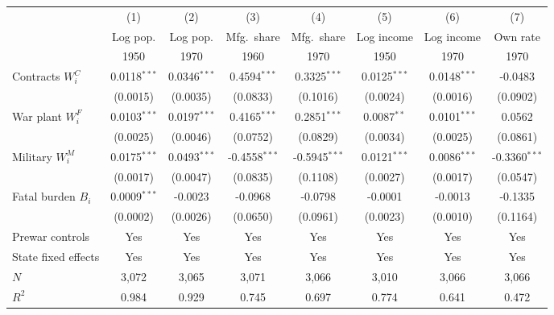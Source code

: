 \begin{tabular}{lccccccc}
\toprule
& (1) & (2) & (3) & (4) & (5) & (6) & (7) \\
& Log pop. & Log pop. & Mfg.\ share & Mfg.\ share & Log income & Log income & Own rate \\
& 1950 & 1970 & 1960 & 1970 & 1950 & 1970 & 1970 \\
\midrule
Contracts $W^C_i$ & 0.0118$^{***}$ & 0.0346$^{***}$ & 0.4594$^{***}$ & 0.3325$^{***}$ & 0.0125$^{***}$ & 0.0148$^{***}$ & -0.0483 \\
 & (0.0015) & (0.0035) & (0.0833) & (0.1016) & (0.0024) & (0.0016) & (0.0902) \\
War plant $W^F_i$ & 0.0103$^{***}$ & 0.0197$^{***}$ & 0.4165$^{***}$ & 0.2851$^{***}$ & 0.0087$^{**}$ & 0.0101$^{***}$ & 0.0562 \\
 & (0.0025) & (0.0046) & (0.0752) & (0.0829) & (0.0034) & (0.0025) & (0.0861) \\
Military $W^M_i$ & 0.0175$^{***}$ & 0.0493$^{***}$ & -0.4558$^{***}$ & -0.5945$^{***}$ & 0.0121$^{***}$ & 0.0086$^{***}$ & -0.3360$^{***}$ \\
 & (0.0017) & (0.0047) & (0.0835) & (0.1108) & (0.0027) & (0.0017) & (0.0547) \\
Fatal burden $B_i$ & 0.0009$^{***}$ & -0.0023 & -0.0968 & -0.0798 & -0.0001 & -0.0013 & -0.1335 \\
 & (0.0002) & (0.0026) & (0.0650) & (0.0961) & (0.0023) & (0.0010) & (0.1164) \\
\midrule
Prewar controls & Yes & Yes & Yes & Yes & Yes & Yes & Yes \\
State fixed effects & Yes & Yes & Yes & Yes & Yes & Yes & Yes \\
$N$ & 3,072 & 3,065 & 3,071 & 3,066 & 3,010 & 3,066 & 3,066 \\
$R^2$ & 0.984 & 0.929 & 0.745 & 0.697 & 0.774 & 0.641 & 0.472 \\
\bottomrule
\end{tabular}